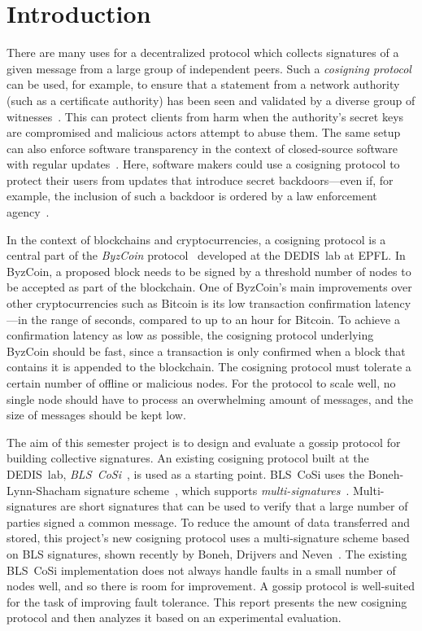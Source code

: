 \section{Introduction}

There are many uses for a decentralized protocol which collects signatures of a given message from a large group of independent peers.
Such a \emph{cosigning protocol} can be used, for example, to ensure that a statement from a network authority (such as a certificate authority) has been seen and validated by a diverse group of witnesses~\cite{Syta16}.
This can protect clients from harm when the authority's secret keys are compromised and malicious actors attempt to abuse them.
The same setup can also enforce software transparency in the context of closed-source software with regular updates~\cite{Niki17}.
Here, software makers could use a cosigning protocol to protect their users from updates that introduce secret backdoors---even if, for example, the inclusion of such a backdoor is ordered by a law enforcement agency~\cite{Ford16}.

In the context of blockchains and cryptocurrencies, a cosigning protocol is a central part of the \emph{\mbox{ByzCoin}} protocol~\cite{Koko16} developed at the DEDIS~lab at EPFL.
In \mbox{ByzCoin}, a proposed block needs to be signed by a threshold number of nodes to be accepted as part of the blockchain.
One of \mbox{ByzCoin}'s main improvements over other cryptocurrencies such as Bitcoin is its low transaction confirmation latency---in the range of seconds, compared to up to an hour for Bitcoin.
To achieve a confirmation latency as low as possible, the cosigning protocol underlying ByzCoin should be fast, since a transaction is only confirmed when a block that contains it is appended to the blockchain.
The cosigning protocol must tolerate a certain number of offline or malicious nodes.
For the protocol to scale well, no single node should have to process an overwhelming amount of messages, and the size of messages should be kept low.

The aim of this semester project is to design and evaluate a gossip protocol for building collective signatures.
An existing cosigning protocol built at the DEDIS~lab, \emph{BLS~CoSi}~\cite{Blscosi}, is used as a starting point.
BLS~CoSi uses the Boneh-Lynn-Shacham signature scheme~\cite{Boneh01}, which supports \emph{multi-signatures}~\cite{Boneh03}.
Multi-signatures are short signatures that can be used to verify that a large number of parties signed a common message.
To reduce the amount of data transferred and stored, this project's new cosigning protocol uses a multi-signature scheme based on BLS signatures, shown recently by Boneh, Drijvers and Neven~\cite{Boneh18}.
The existing BLS~CoSi implementation does not always handle faults in a small number of nodes well, and so there is room for improvement.
A gossip protocol is well-suited for the task of improving fault tolerance.
This report presents the new cosigning protocol and then analyzes it based on an experimental evaluation.

